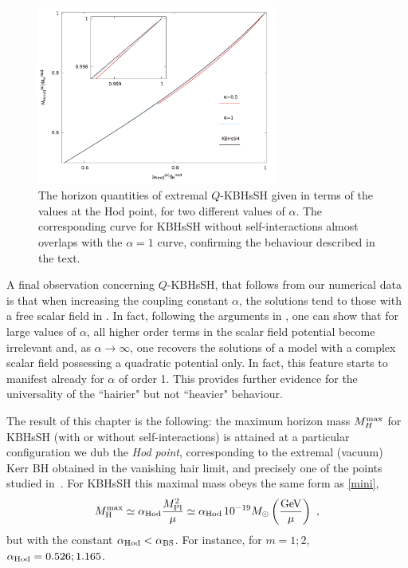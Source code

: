 \begin{figure}[h!]
  \begin{center}
    \includegraphics[width=0.7\textwidth]{papers/selfInteractions/horizon-ratios-Q.png}
      \end{center}
      \caption{ The horizon quantities of extremal  $Q$-KBHsSH given in terms of the values at the Hod point, for two different values of $\alpha$. The corresponding curve for KBHsSH without self-interactions almost overlaps with the $\alpha=1$ curve, confirming the behaviour described in the text.}
  \label{horizon_ratios_q}
\end{figure}


A final observation concerning $Q$-KBHsSH, that follows from our numerical data 
is that 
when increasing the coupling
constant  $\alpha$,
the solutions tend to those with a free scalar field in \cite{Herdeiro:2014goa}. 
In fact, 
following the arguments in \cite{Kleihaus:2005me}, one can show that 
for large values of $\alpha$, all higher order terms in the scalar field potential become irrelevant
and, as $\alpha\to \infty$, one recovers the solutions of a model with a complex scalar field  
possessing a quadratic potential only. In fact, this feature starts to manifest already for $\alpha$  of order 1. This provides further evidence for the universality of the ``hairier" but not ``heavier" behaviour.

The result of this chapter is the following: the maximum horizon mass $M^{\rm max}_H$ for KBHsSH (with or without self-interactions) is attained at a particular configuration we dub the \textit{Hod point}, corresponding to the extremal (vacuum) Kerr BH obtained in the vanishing hair limit, and precisely one of the points studied in~\cite{Hod:2012px}.
For KBHsSH this maximal mass obeys the same form as \eqref{mini},
\begin{equation}
  M_{\rm H}^{\rm max}\simeq \alpha_{\rm Hod} \frac{M_{\rm Pl}^2}{\mu}\simeq \alpha_{\rm Hod} \, 10^{-19}M_\odot\left(\frac{\rm GeV}{\mu}\right)\ , 
\label{hodpoint}
\end{equation}
 but with the constant $\alpha_{\rm Hod}<\alpha_{\rm BS}$. For instance, for $m=1;2$, $\alpha_{\rm Hod}=0.526; 1.165$. 

